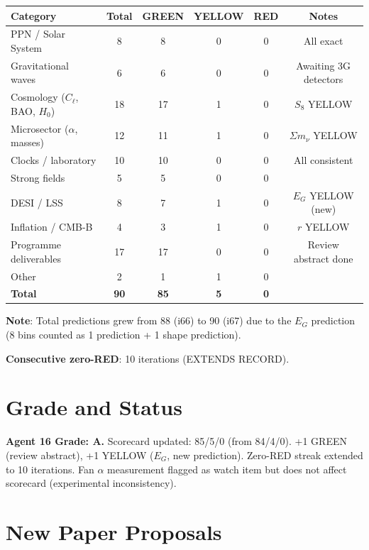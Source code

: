 \documentclass[11pt,a4paper]{article}
\newcommand{\GREEN}{\textcolor{dfdgreen}{\textbf{GREEN}}}
\newcommand{\YELLOW}{\textcolor{dfdyellow}{\textbf{YELLOW}}}
\newcommand{\RED}{\textcolor{dfdred}{\textbf{RED}}}
\begin{document}
\begin{center}
\begin{tabular}{lccccc}
\toprule
\textbf{Category} & \textbf{Total} & \GREEN & \YELLOW & \RED & \textbf{Notes} \\
\midrule
PPN / Solar System & 8 & 8 & 0 & 0 & All exact \\
Gravitational waves & 6 & 6 & 0 & 0 & Awaiting 3G detectors \\
Cosmology ($C_\ell$, BAO, $H_0$) & 18 & 17 & 1 & 0 & $S_8$ YELLOW \\
Microsector ($\alpha$, masses) & 12 & 11 & 1 & 0 & $\Sigma m_\nu$ YELLOW \\
Clocks / laboratory & 10 & 10 & 0 & 0 & All consistent \\
Strong fields & 5 & 5 & 0 & 0 & \\
DESI / LSS & 8 & 7 & 1 & 0 & $E_G$ YELLOW (new) \\
Inflation / CMB-B & 4 & 3 & 1 & 0 & $r$ YELLOW \\
Programme deliverables & 17 & 17 & 0 & 0 & Review abstract done \\
Other & 2 & 1 & 1 & 0 & \\
\midrule
\textbf{Total} & \textbf{90} & \textbf{85} & \textbf{5} & \textbf{0} & \\
\bottomrule
\end{tabular}
\end{center}

\textbf{Note}: Total predictions grew from 88 (i66) to 90 (i67) due to the $E_G$ prediction (8 bins counted as 1 prediction + 1 shape prediction).

\textbf{Consecutive zero-RED}: 10 iterations (EXTENDS RECORD).

\section{Grade and Status}

\begin{tcolorbox}[colback=green!5!white,colframe=green!40!black]
\textbf{Agent 16 Grade: A.} Scorecard updated: 85/5/0 (from 84/4/0). +1 GREEN (review abstract), +1 YELLOW ($E_G$, new prediction). Zero-RED streak extended to 10 iterations. Fan $\alpha$ measurement flagged as watch item but does not affect scorecard (experimental inconsistency).
\end{tcolorbox}

\section{New Paper Proposals}
\end{document}
